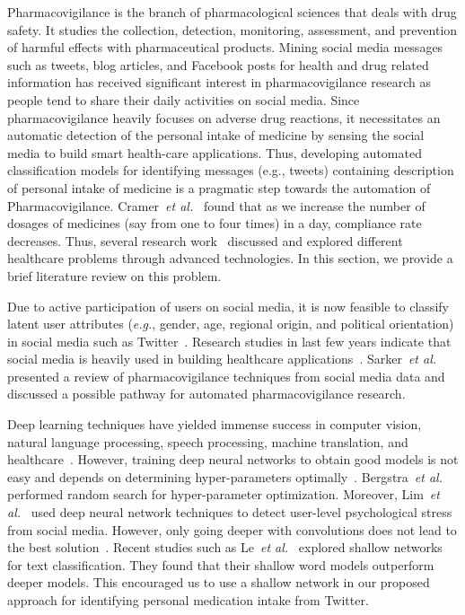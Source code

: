 \documentclass[conference]{IEEEtran}
\begin{document}
Pharmacovigilance is the branch of pharmacological sciences that deals with drug safety. It studies
the collection, detection, monitoring, assessment, and prevention of harmful effects with
pharmaceutical products. Mining social media messages such as tweets, blog articles, and Facebook
posts for health and drug related information has received significant interest in
pharmacovigilance research as people tend to share their daily activities on social media.
Since pharmacovigilance heavily focuses on adverse drug reactions, it necessitates an automatic
detection of the personal intake of medicine by sensing the social media to build smart
health-care applications. Thus, developing automated classification models for identifying
messages (e.g., tweets) containing description of personal intake of medicine is a pragmatic
step towards the automation of Pharmacovigilance. Cramer~\emph{et al.}~\cite{cramer1989often} 
found that as we increase the number of dosages of medicines (say from one to four times) in 
a day, compliance rate decreases. Thus, several research work~\cite{harmark2008pharmacovigilance, saparova2012motivating, cambria2012sentic} 
discussed and explored different healthcare problems through advanced technologies. 
In this section, we provide a brief literature review on this problem.

Due to active participation of users on social media, it is now feasible
to classify latent user attributes (\emph{e.g.}, gender, age, regional origin,
and political orientation) in social media such as Twitter~\cite{rao2010classifying}.
Research studies in last few years indicate that social media is heavily used
in building healthcare applications~\cite{grajales2014social, Sarker2016, rosenthal2017semeval}.
Sarker~\emph{et al.}~\cite{sarker2015utilizing} presented a review of pharmacovigilance techniques from
social media data and discussed a possible pathway for automated pharmacovigilance research.

Deep learning techniques have yielded immense success in computer vision, natural 
language processing, speech processing, machine translation, and 
healthcare~\cite{kim2014convolutional, liang2014deep, shin2016lexicon, denkowski2017stronger}. 
However, training deep neural networks to obtain good models is not easy and depends on 
determining hyper-parameters optimally~\cite{glorot2010understanding}. 
Bergstra~\emph{et al.}~\cite{bergstra2012random} performed random search for hyper-parameter 
optimization. Moreover, Lim~\emph{et al.}~\cite{lin2014user} used deep neural network 
techniques to detect user-level psychological stress from social media. However, only
going deeper with convolutions does not lead to the best solution~\cite{szegedy2015going}. 
Recent studies such as Le~\emph{et al.}~\cite{le2017convolutional} explored 
shallow networks for text classification. They found that their shallow word models outperform 
deeper models. This encouraged us to use a shallow network in our proposed approach 
for identifying personal medication intake from Twitter.
\end{document}
